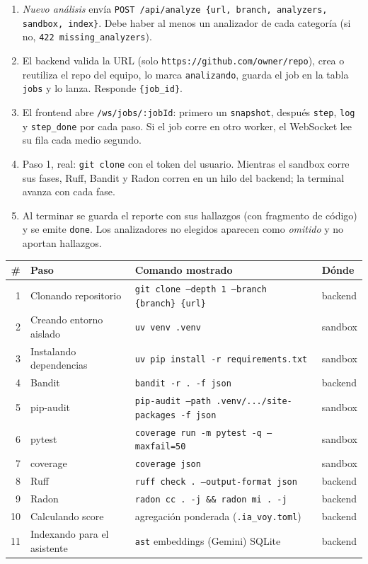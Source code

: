 \documentclass[11pt,a4paper]{article}
\newcommand{\code}[1]{\texttt{\small #1}}
\newcommand{\ruta}[1]{\texttt{\small\color{branddark}#1}}
\newcommand{\flecha}{\textrightarrow{}}
\begin{document}
\begin{enumerate}
  \item \emph{Nuevo análisis} envía \code{POST /api/analyze \{url, branch, analyzers, sandbox, index\}}. Debe haber al
        menos un analizador de cada categoría (si no, \code{422 missing\_analyzers}).
  \item El backend valida la URL (solo \code{https://github.com/owner/repo}), crea o reutiliza el repo del equipo, lo
        marca \code{analizando}, guarda el job en la tabla \code{jobs} y lo lanza. Responde \code{\{job\_id\}}.
  \item El frontend abre \ruta{/ws/jobs/:jobId}: primero un \code{snapshot}, después \code{step}, \code{log} y
        \code{step\_done} por cada paso. Si el job corre en otro worker, el WebSocket lee su fila cada medio segundo.
  \item Paso 1, real: \code{git clone} con el token del usuario. Mientras el sandbox corre sus fases, Ruff, Bandit y Radon
        corren en un hilo del backend; la terminal avanza con cada fase.
  \item Al terminar se guarda el reporte con sus hallazgos (con fragmento de código) y se emite \code{done}. Los
        analizadores no elegidos aparecen como \emph{omitido} y no aportan hallazgos.
\end{enumerate}

\begin{center}
\small
\begin{tabularx}{\linewidth}{@{}rlLl@{}}
\toprule
\textbf{\#} & \textbf{Paso} & \textbf{Comando mostrado} & \textbf{Dónde} \\
 & Clonando repositorio & \code{git clone --depth 1 --branch \{branch\} \{url\}} & backend \\
2 & Creando entorno aislado & \code{uv venv .venv} & sandbox \\
3 & Instalando dependencias & \code{uv pip install -r requirements.txt} & sandbox \\
4 & Bandit & \code{bandit -r . -f json} & backend \\
5 & pip-audit & \code{pip-audit --path .venv/.../site-packages -f json} & sandbox \\
6 & pytest & \code{coverage run -m pytest -q --maxfail=50} & sandbox \\
7 & coverage & \code{coverage json} & sandbox \\
8 & Ruff & \code{ruff check . --output-format json} & backend \\
9 & Radon & \code{radon cc . -j \&\& radon mi . -j} & backend \\
10 & Calculando score & agregación ponderada (\code{.ia\_voy.toml}) & backend \\
11 & Indexando para el asistente & \code{ast} \flecha{} embeddings (Gemini) \flecha{} SQLite & backend \\
\bottomrule
\end{tabularx}
\end{center}
\end{document}
